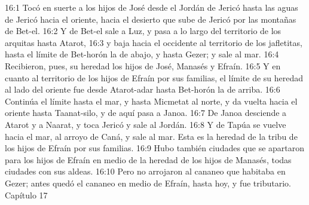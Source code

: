 16:1 Tocó en suerte a los hijos de José desde el Jordán de Jericó hasta las aguas de Jericó hacia el oriente, hacia el desierto que sube de Jericó por las montañas de Bet-el.  
16:2 Y de Bet-el sale a Luz, y pasa a lo largo del territorio de los arquitas hasta Atarot,  
16:3 y baja hacia el occidente al territorio de los jafletitas, hasta el límite de Bet-horón la de abajo, y hasta Gezer; y sale al mar.  
16:4 Recibieron, pues, su heredad los hijos de José, Manasés y Efraín.  
16:5 Y en cuanto al territorio de los hijos de Efraín por sus familias, el límite de su heredad al lado del oriente fue desde Atarot-adar hasta Bet-horón la de arriba.  
16:6 Continúa el límite hasta el mar, y hasta Micmetat al norte, y da vuelta hacia el oriente hasta Taanat-silo, y de aquí pasa a Janoa.  
16:7 De Janoa desciende a Atarot y a Naarat, y toca Jericó y sale al Jordán.  
16:8 Y de Tapúa se vuelve hacia el mar, al arroyo de Caná, y sale al mar. Esta es la heredad de la tribu de los hijos de Efraín por sus familias.  
16:9 Hubo también ciudades que se apartaron para los hijos de Efraín en medio de la heredad de los hijos de Manasés, todas ciudades con sus aldeas.  
16:10 Pero no arrojaron al cananeo que habitaba en Gezer; antes quedó el cananeo en medio de Efraín, hasta hoy, y fue tributario.  
Capítulo 17

